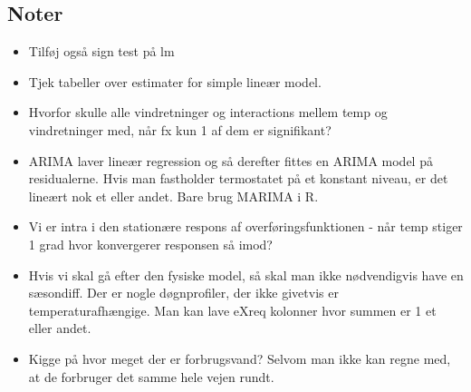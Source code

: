 \subsection{Noter}
\begin{itemize}
    \item Tilføj også sign test på lm 
    \item Tjek tabeller over estimater for simple lineær model. 
    \item Hvorfor skulle alle vindretninger og interactions mellem temp og vindretninger med, når fx kun 1 af dem er signifikant?
    \item ARIMA laver lineær regression og så derefter fittes en ARIMA model på residualerne. Hvis man fastholder termostatet på et konstant niveau, er det lineært nok et eller andet. Bare brug MARIMA i R. 
    \item Vi er intra i den stationære respons af overføringsfunktionen - når temp stiger 1 grad hvor konvergerer responsen så imod?
    \item Hvis vi skal gå efter den fysiske model, så skal man ikke nødvendigvis have en sæsondiff. Der er nogle døgnprofiler, der ikke givetvis er temperaturafhængige. Man kan lave eXreq kolonner hvor summen er 1 et eller andet. 
    \item Kigge på hvor meget der er forbrugsvand? Selvom man ikke kan regne med, at de forbruger det samme hele vejen rundt. 
\end{itemize}